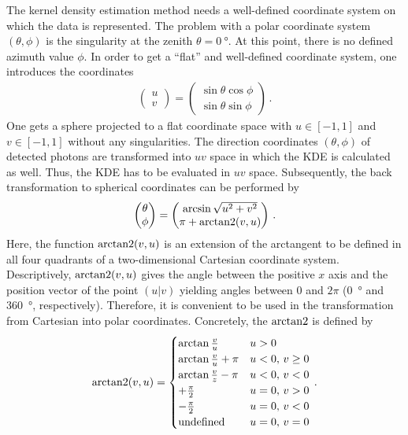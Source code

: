 The kernel density estimation method needs a well-defined coordinate system on which the data is represented. The problem with a polar coordinate system $(\theta,\phi)$ is the singularity at the zenith $\theta=\SI{0}{\degree}$. At this point, there is no defined azimuth value $\phi$. In order to get a \enquote{flat} and well-defined coordinate system, one introduces the coordinates
\begin{align}
	\begin{pmatrix}u\\v\end{pmatrix} = \begin{pmatrix}\sin\theta\cos\phi\\\sin\theta\sin\phi\end{pmatrix}\,.
\end{align}
One gets a sphere projected to a flat coordinate space with $u\in[-1,1]$ and $v\in[-1,1]$ without any singularities. The direction coordinates $(\theta,\phi)$ of detected photons are transformed into $uv$ space in which the KDE is calculated as well. Thus, the KDE has to be evaluated in $uv$ space. Subsequently, the back transformation to spherical coordinates can be performed by
\begin{align}
	\begin{pmatrix}
		\theta\\
		\phi
	\end{pmatrix}
	= 
	\begin{pmatrix}
		\arcsin\sqrt{u^2+v^2}\\
		\pi+\operatorname{arctan2}(v,u)
		\end{pmatrix}\,.
\end{align} 
Here, the function $\operatorname{arctan2}(v,u)$ is an extension of the arctangent to be defined in all four quadrants of a two-dimensional Cartesian coordinate system. Descriptively, $\operatorname{arctan2}(v,u)$ gives the angle between the positive $x$ axis and the position vector of the point $(u|v)$ yielding angles between $0$ and $2\pi$ (\SI{0}{\degree} and \SI{360}{\degree}, respectively). Therefore, it is convenient to be used in the transformation from Cartesian into polar coordinates. Concretely, the $\operatorname{arctan2}$ is defined by
\begin{align}
	\operatorname{arctan2}(v,u)=
	\begin{cases}
		\arctan\frac{v}{u} & u > 0\\
		\arctan\frac{v}{u} + \pi & u < 0,\,v \geq 0\\
		\arctan\frac{v}{z} - \pi & u < 0,\,v < 0 \\
		+\frac{\pi}{2} & u = 0,\,v > 0\\
		-\frac{\pi}{2} & u = 0,\,v < 0\\
		\text{undefined} & u = 0,\,v = 0
	\end{cases}\,.
\end{align}

